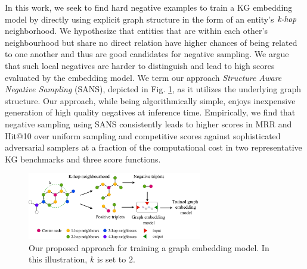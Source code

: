 In this work, we seek to find hard negative examples to train a KG embedding model by directly using explicit graph structure in the form of an entity's $\emph{k-hop}$ neighborhood. We hypothesize that entities that are within each other's neighbourhood but share no direct relation have higher chances of being related to one another and thus are good candidates for negative sampling. We argue that such local negatives are harder to distinguish and lead to high scores evaluated by the embedding model. We term our approach \emph{Structure Aware Negative Sampling} (SANS), depicted in Fig. \ref{fig:arch}, as it utilizes the underlying graph structure. Our approach, while being algorithmically simple, enjoys inexpensive generation of high quality negatives at inference time. Empirically, we find that negative sampling using SANS consistently leads to higher scores in MRR and Hit@10 over uniform sampling and competitive scores against sophisticated adversarial samplers at a fraction of the computational cost in two representative KG benchmarks and three score functions. 

\begin{figure}
    \centering
    \includegraphics[width=3in]{writeup/archfig.png}
    \caption{Our proposed approach for training a graph embedding model. In this illustration, $k$ is set to $2$.}
    \label{fig:arch}
\end{figure}


